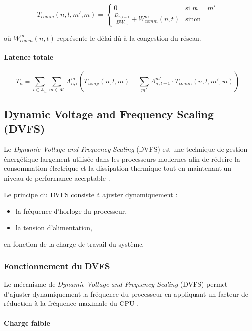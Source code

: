 \documentclass[12pt,a4paper]{report}
\begin{document}
\begin{equation}
T_{comm}(n,l,m',m) =
\begin{cases}
0 & \text{si } m = m' \\
\frac{D_{n,l-1}}{BW_m} + W_{comm}^m(n,t) & \text{sinon}
\end{cases}
\end{equation}

où $W_{comm}^m(n,t)$ représente le délai dû à la congestion du réseau.

\paragraph{Latence totale}

\begin{equation}
T_n = \sum_{l \in \mathcal{L}_n} \sum_{m \in \mathcal{M}} A_{n,l}^m 
\left( T_{comp}(n,l,m) + \sum_{m'} A_{n,l-1}^{m'} \cdot T_{comm}(n,l,m',m) \right)
\end{equation}

\subsection{Dynamic Voltage and Frequency Scaling (DVFS)}

Le \textit{Dynamic Voltage and Frequency Scaling} (DVFS) est une technique de gestion énergétique largement utilisée dans les processeurs modernes afin de réduire la consommation électrique et la dissipation thermique tout en maintenant un niveau de performance acceptable \cite{suleiman_dvfs, wu2005dvfs}.

Le principe du DVFS consiste à ajuster dynamiquement :
\begin{itemize}
    \item la fréquence d’horloge du processeur,
    \item la tension d’alimentation,
\end{itemize}
en fonction de la charge de travail du système.

\subsubsection{Fonctionnement du DVFS}

Le mécanisme de \textit{Dynamic Voltage and Frequency Scaling} (DVFS) permet d’ajuster dynamiquement la fréquence du processeur en appliquant un facteur de réduction à la fréquence maximale du CPU \cite{lesueur2010dvfs}.

\paragraph{Charge faible}
\end{document}
